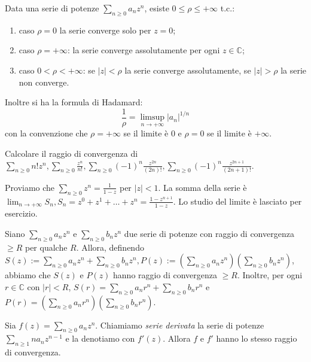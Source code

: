 \begin{prop}
  Data una serie di potenze $\displaystyle \sum_{n \ge 0} a_nz^n$, esiste $0 \le \rho \le +\infty$ t.c.:
  \begin{enumerate}
    \item caso $\rho=0$ la serie converge solo per $z=0$;
    \item caso $\rho=+\infty$: la serie converge assolutamente per ogni $z \in \mathbb{C}$;
    \item caso $0<\rho<+\infty$: se $|z|<\rho$ la serie converge assolutamente, se $|z|>\rho$ la serie non converge.
  \end{enumerate}
  Inoltre si ha la formula di Hadamard:
  $$\frac{1}{\rho}=\limsup_{n \longrightarrow +\infty} |a_n|^{1/n}$$
  con la convenzione che $\rho=+\infty$ se il limite è $0$ e $\rho=0$ se il limite è $+\infty$.
\end{prop}

\begin{exc}
  Calcolare il raggio di convergenza di \\
  $\displaystyle \sum_{n \ge 0} n!z^n, \sum_{n \ge 0} \frac{z^n}{n!}, \sum_{n \ge 0} (-1)^n \frac{z^{2n}}{(2n)!}, \sum_{n \ge 0} (-1)^n \frac{z^{2n+1}}{(2n+1)!}$.
\end{exc}

\begin{ex}
  Proviamo che $\displaystyle \sum_{n \ge 0} z^n=\frac{1}{1-z}$ per $|z|<1$. La somma della serie è $\displaystyle \lim_{n \longrightarrow +\infty}S_n, S_n=z^0+z^1+\dots+z^n=\frac{1-z^{n+1}}{1-z}$. Lo studio del limite è lasciato per esercizio.
\end{ex}

\begin{ftt}
  \begin{nlist}
    \item Siano $\displaystyle \sum_{n \ge 0} a_nz^n$ e $\displaystyle \sum_{n \ge 0} b_nz^n$ due serie di potenze con raggio di convergenza $\ge R$ per qualche $R$.
    Allora, definendo $\displaystyle S(z):=\sum_{n \ge 0} a_nz^n+\sum_{n \ge 0}b_nz^n, P(z):=\left(\sum_{n \ge 0}a_nz^n\right)\left(\sum_{n \ge 0}b_nz^n\right)$, abbiamo che $S(z)$ e $P(z)$ hanno raggio di convergenza $\ge R$.
    Inoltre, per ogni $r \in \mathbb{C}$ con $|r|<R$, $\displaystyle S(r)=\sum_{n \ge 0}a_nr^n+\sum_{n \ge 0} b_nr^n$ e $\displaystyle P(r)=\left(\sum_{n \ge 0}a_nr^n\right)\left(\sum_{n \ge 0}b_nr^n\right)$.
    \item Sia $\displaystyle f(z)=\sum_{n \ge 0} a_nz^n$. Chiamiamo \textit{serie derivata} la serie di potenze $\displaystyle \sum_{n \ge 1} na_nz^{n-1}$ e la denotiamo con $f'(z)$. Allora $f$ e $f'$ hanno lo stesso raggio di convergenza.
  \end{nlist}
\end{ftt}

